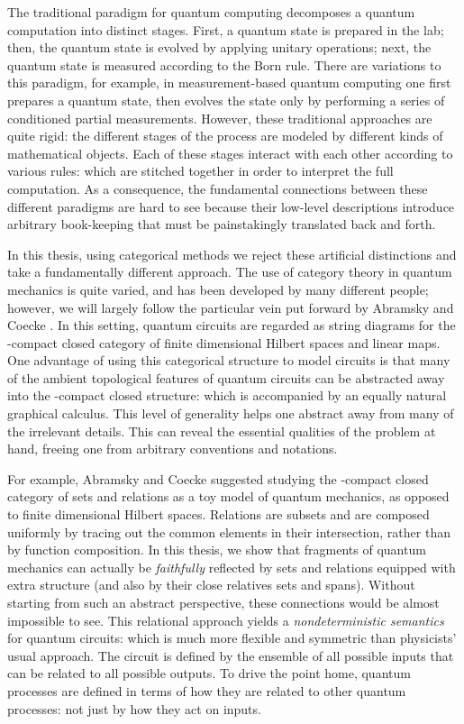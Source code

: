The traditional paradigm for quantum computing decomposes a quantum computation into  distinct stages. First, a quantum state is prepared in the lab; then, the quantum state is evolved by applying unitary operations; next, the quantum state is measured according to the Born rule.  There are variations to this paradigm, for example, in measurement-based quantum computing one first  prepares a quantum state, then evolves the state only by performing a series of conditioned partial measurements. However, these traditional approaches are quite rigid: the different stages of the process are modeled by different kinds of mathematical objects. Each of these stages interact with each other according to various rules: which are stitched together in order to interpret the full computation. As a consequence, the fundamental connections between these different paradigms are hard to see because their low-level descriptions introduce arbitrary book-keeping that must be painstakingly translated back and forth.

In this thesis, using categorical methods we reject these artificial distinctions and take a fundamentally different approach.  The use of category theory in quantum mechanics is quite varied, and has been developed by many different people; however, we will largely follow the particular vein put forward by Abramsky and Coecke \cite{abramsky}.  In this setting, quantum circuits are regarded as string diagrams for the \dag-compact closed category of finite dimensional Hilbert spaces and linear maps.  One advantage of using this categorical structure to model circuits is that many of the ambient topological features of quantum circuits can be abstracted away into the \dag-compact closed structure: which is accompanied by an equally natural graphical calculus.  This level of generality helps one abstract away from many of the irrelevant details. This can reveal the essential qualities of the problem at hand, freeing one from arbitrary conventions and notations.


For example,  Abramsky and Coecke suggested studying the \dag-compact closed category of sets and relations as a toy model of quantum mechanics, as opposed to finite dimensional Hilbert spaces.  Relations are subsets and are composed uniformly by tracing out the common elements in their intersection, rather than by function composition. 
In this thesis, we show that fragments of quantum mechanics can actually be {\em faithfully} reflected by sets and relations equipped with extra structure (and also by their close relatives sets and spans). Without starting from such an abstract perspective, these connections would be almost impossible to see.   
This relational approach  yields a {\em nondeterministic semantics} for quantum circuits: which is much more flexible and symmetric than physicists' usual approach.  The circuit is defined by the ensemble of all possible inputs that can be related to all possible outputs.  To drive the point home, quantum processes are defined in terms of how they are related to other quantum processes: not just by how they act on inputs.


